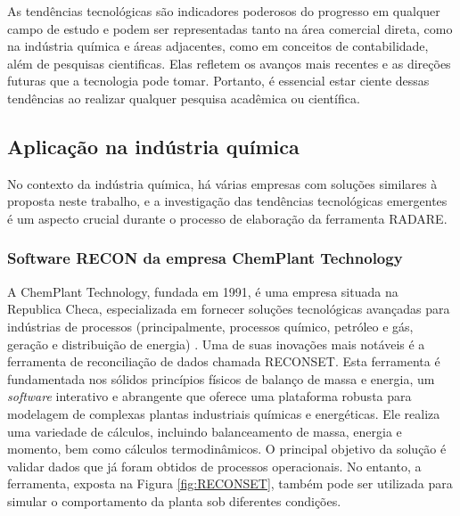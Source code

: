 As tendências tecnológicas são indicadores poderosos do progresso em qualquer campo de estudo e podem ser representadas tanto na área comercial direta, como na indústria química e áreas adjacentes, como em conceitos de contabilidade, além de pesquisas cientificas. Elas refletem os avanços mais recentes e as direções futuras que a tecnologia pode tomar. Portanto, é essencial estar ciente dessas tendências ao realizar qualquer pesquisa acadêmica ou científica.

\subsection{Aplicação na indústria química}

No contexto da indústria química, há várias empresas com soluções similares à proposta neste trabalho, e a investigação das tendências tecnológicas emergentes é um aspecto crucial durante o processo de elaboração da ferramenta RADARE.

\subsubsection{Software RECON da empresa ChemPlant Technology}

A ChemPlant Technology, fundada em 1991, é uma empresa situada na Republica Checa, especializada em fornecer soluções tecnológicas avançadas para indústrias de processos (principalmente, processos químico, petróleo e gás, geração e distribuição de energia) \cite{reconset}. Uma de suas inovações mais notáveis é a ferramenta de reconciliação de dados chamada RECONSET. Esta ferramenta é fundamentada nos sólidos princípios físicos de balanço de massa e energia, um \textit{software} interativo  e abrangente que oferece uma plataforma robusta para modelagem de complexas plantas industriais químicas e energéticas. Ele realiza uma variedade de cálculos, incluindo balanceamento de massa, energia e momento, bem como cálculos termodinâmicos. O principal objetivo da solução é validar dados que já foram obtidos de processos operacionais. No entanto, a ferramenta, exposta na Figura \ref{fig:RECONSET}, também pode ser utilizada para simular o comportamento da planta sob diferentes condições.

